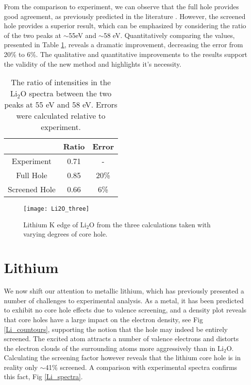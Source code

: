 From the comparison to experiment, we can observe that the full hole provides good agreement, as previously predicted in the literature \cite{mauchamp_ab_2006}. However, the screened hole provides a superior result, which can be emphasized by considering the ratio of the two peaks at $\sim$55eV and $\sim$58 eV.  Quantitatively comparing the values, presented in Table \ref{ratio}, reveals a dramatic improvement, decreasing the error from 20\% to  6\%.  The qualitative and quantitative improvements to the results support the validity of the new method and highlights it's necessity.  

\begin{table}
	\centering
	\begin{tabular}{ccc}
		& Ratio & Error \\
		\hline
		Experiment & 0.71 & -  \\
		Full Hole & 0.85 & 20\%  \\
		Screened Hole & 0.66 & 6\%  \\
		
	\end{tabular}
	\caption{The ratio of intensities in the $\mathrm{Li_2O}$ spectra between the two peaks at 55 eV and 58 eV.  Errors were calculated relative to experiment.   }
	\label{ratio}
\end{table}




\begin{figure}
	\centering
	\texttt{[image: Li2O\_three]}
	\caption{Lithium K edge of $ \mathrm{Li_2O} $ from the three calculations taken with varying degrees of core hole. }
	\label{Li2O_three}
\end{figure}

\section{Lithium}
We now shift our attention to metallic lithium, which has previously presented a  number of challenges to experimental analysis.  As a metal, it has been predicted to exhibit no core hole effects due to valence screening, and a density plot reveals that core  holes have a large impact on the electron density, see Fig \ref{Li_countours}, supporting the notion that the hole may indeed be entirely screened.  The excited atom attracts a number of valence electrons and  distorts the electron clouds of the surrounding atoms more aggressively than in $ \mathrm{Li_2O} $.  Calculating the screening factor however reveals that the lithium core hole is in reality only $ \sim$41\% screened.  A comparison with experimental spectra confirms this fact, Fig \ref{Li_spectra}.


